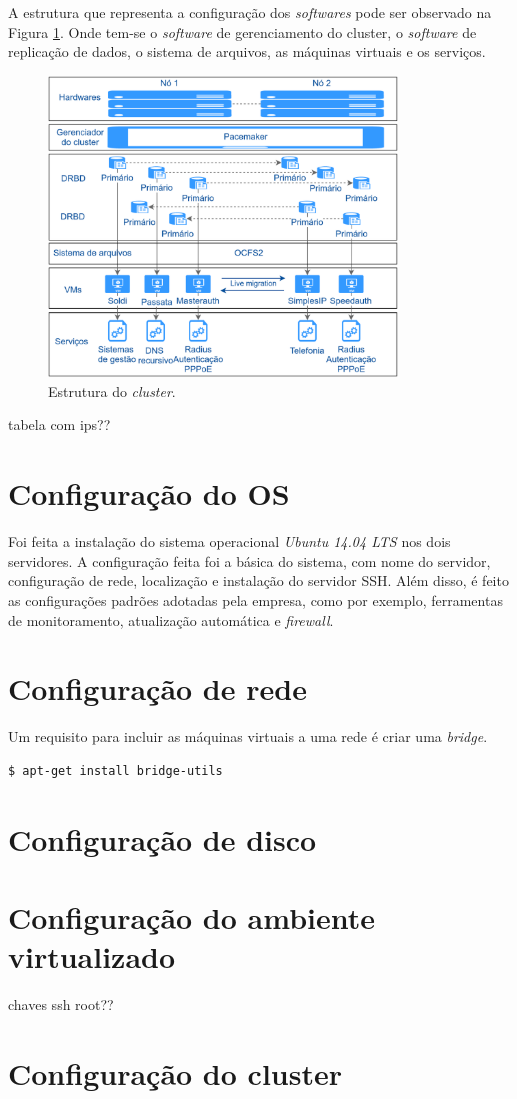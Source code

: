 A estrutura que representa a configuração dos \textit{softwares} pode ser observado na Figura \ref{fig:projeto_estrutura}. Onde tem-se o 
\textit{software} de gerenciamento do cluster, o \textit{software} de replicação de dados, o sistema de arquivos, as máquinas virtuais e os 
serviços.

\begin{figure}[h!]
 \centering
 \includegraphics[width=350px]{img/projeto_estrutura.eps}
 \caption{Estrutura do \textit{cluster}.}
 \label{fig:projeto_estrutura}
\end{figure}

tabela com ips??

\section{Configuração do \ac{OS}}

Foi feita a instalação do sistema operacional \textit{Ubuntu 14.04 \ac{LTS}} nos dois servidores. A configuração feita foi a básica do sistema,
com nome do servidor, configuração de rede, localização e instalação do servidor \ac{SSH}.
Além disso, é feito as configurações padrões adotadas pela empresa, como por exemplo, ferramentas de monitoramento, atualização automática
e \textit{firewall}.

\section{Configuração de rede}

Um requisito para incluir as máquinas virtuais a uma rede é criar uma \textit{bridge}. 

\begin{lstlisting}[language=bash]
  $ apt-get install bridge-utils
\end{lstlisting}

\section{Configuração de disco}


\section{Configuração do ambiente virtualizado}

chaves ssh root??

\section{Configuração do cluster}


